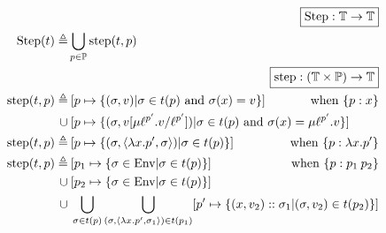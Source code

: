 \begin{align*}
                             & \pushright{\fbox{$\Step:\mathbb{T}\rightarrow\mathbb{T}$}}                                                                                                                                                              \\
  \Step(\ptree)   \triangleq & \bigcup_{p\in\mathbb{P}}\step(\ptree,p)                                                                                                                                                                                 \\
                             & \pushright{\fbox{$\step:(\mathbb{T}\times\mathbb{P})\rightarrow\mathbb{T}$}}                                                                                                                                            \\
  \step(\ptree,p) \triangleq & \specialcell{\:[p\mapsto\{(\ctx,v)|\ctx\in\ptree(p)\text{ and }\ctx(x)=v\}]\hfill\text{when }\plabel{p}{x}}                                                                                                             \\
  \cup                       & \: [p\mapsto\{(\ctx,v[\mu\llabel{p'}{\ell}.v/\llabel{p'}{\ell}])|\ctx\in \ptree(p)\text{ and }\ctx(x)=\mu\llabel{p'}{\ell}.v\}]                                                                                         \\
  \step(\ptree,p) \triangleq & \specialcell{\:[p\mapsto\{(\ctx,\langle\lambda x.p',\ctx\rangle)|\ctx\in \ptree(p)\}]\hfill\text{when }\plabel{p}{\lambda x.p'}}                                                                                        \\
  \step(\ptree,p) \triangleq & \specialcell{\:[p_1\mapsto\{\ctx\in\Ctx|\ctx\in \ptree(p)\}]\hfill\text{when }\plabel{p}{p_1\:p_2}}                                                                                                                     \\
  \cup                       & \: [p_2\mapsto\{\ctx\in\Ctx|\ctx\in \ptree(p)\}]                                                                                                                                                                        \\
  \cup                       & \: \bigcup_{\ctx\in \ptree(p)}\bigcup_{(\ctx,\langle\lambda x.p',\ctx_1\rangle)\in \ptree(p_1)}[p'\mapsto\{(x,v_2)\cons\ctx_1|(\ctx,v_2)\in \ptree(p_2)\}]                                                              \\

\end{align*}

